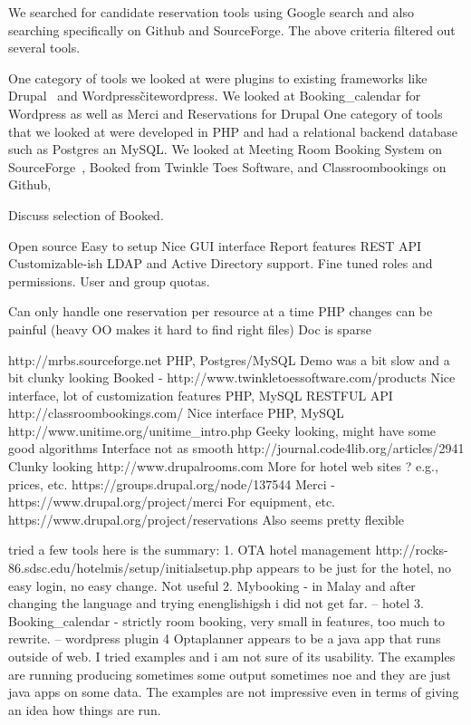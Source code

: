 \documentclass{acm_proc_article-sp}
\begin{document}
We searched for candidate reservation tools using Google search and also searching specifically on Github and SourceForge.  The above criteria filtered out several tools.  

One category of tools we looked at were plugins to existing frameworks like Drupal~\cite{drupal} and Wordpress\~cite{wordpress}.  We looked at Booking\_calendar for Wordpress as well as Merci and Reservations for Drupal   
One category of tools that we looked at were developed in PHP and had a relational backend database such as Postgres an MySQL.  We looked at Meeting Room Booking System on SourceForge~\cite{mrbs}, Booked from Twinkle Toes Software, and Classroombookings on Github, 



Discuss selection of Booked.

Open source
Easy to setup
Nice GUI interface
Report features
REST API
Customizable-ish
LDAP and Active Directory support.
Fine tuned roles and permissions.
User and group quotas.

Can only handle one reservation per resource at a time
PHP changes can be painful (heavy OO makes it hard to find right files)
Doc is sparse

http://mrbs.sourceforge.net
	PHP, Postgres/MySQL
	Demo was a bit slow and a bit clunky looking
Booked - http://www.twinkletoessoftware.com/products
	Nice interface, lot of customization features
	PHP, MySQL
	RESTFUL API
http://classroombookings.com/
	Nice interface
	PHP, MySQL
http://www.unitime.org/unitime\_intro.php
	Geeky looking, might have some good algorithms
	Interface not as smooth
	http://journal.code4lib.org/articles/2941
	Clunky looking
http://www.drupalrooms.com
	More for hotel web sites ? e.g., prices, etc.
https://groups.drupal.org/node/137544
	Merci - https://www.drupal.org/project/merci
		For equipment, etc.
	https://www.drupal.org/project/reservations
		Also seems pretty flexible
		
		
 tried a few tools  here is the summary:
1. OTA hotel management   http://rocks-86.sdsc.edu/hotelmis/setup/initialsetup.php
    appears to be just for the hotel, no easy login, no easy change. Not useful
2. Mybooking - in Malay and after changing the language and trying enenglishigsh i did not get far. -- hotel
3. Booking\_calendar - strictly room booking, very small in features, too much to rewrite. -- wordpress plugin
4 Optaplanner appears to be a java app that runs outside of web. I tried examples and i am
   not sure of its usability. The examples are running producing sometimes some output sometimes noe
   and they are just java apps on some data. The examples  are not impressive even in terms of giving
   an idea how things are run. 
\end{document}
